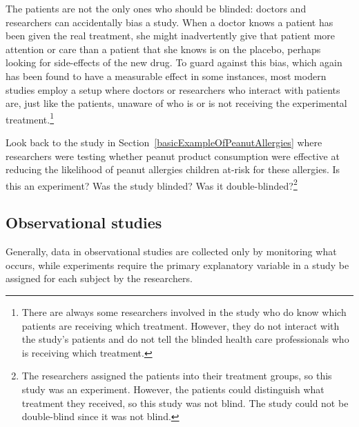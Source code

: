 \begin{doublespace}
The patients are not the only ones who should be blinded: doctors and researchers can accidentally bias a study. When a doctor knows a patient has been given the real treatment, she might inadvertently give that patient more attention or care than a patient that she knows is on the placebo, perhaps looking for side-effects of the new drug. To guard against this bias, which again has been found to have a measurable effect in some instances, most modern studies employ a  setup where doctors or researchers who interact with patients are, just like the patients, unaware of who is or is not receiving the experimental treatment.\footnote{There are always some researchers involved in the study who do know which patients are receiving which treatment. However, they do not interact with the study's patients and do not tell the blinded health care professionals who is receiving which treatment.}

\begin{exercise}
	Look back to the study in Section~\ref{basicExampleOfPeanutAllergies} where researchers were testing whether peanut product consumption were effective at reducing the likelihood of peanut allergies children at-risk for these allergies. Is this an experiment? Was the study blinded? Was it double-blinded?\footnote{The researchers assigned the patients into their treatment groups, so this study was an experiment. However, the patients could distinguish what treatment they received, so this study was not blind. The study could not be double-blind since it was not blind.}
\end{exercise}




\subsection{Observational studies}

Generally, data in observational studies are collected only by monitoring what occurs, while experiments require the primary explanatory variable in a study be assigned for each subject by the researchers.


\end{doublespace}
